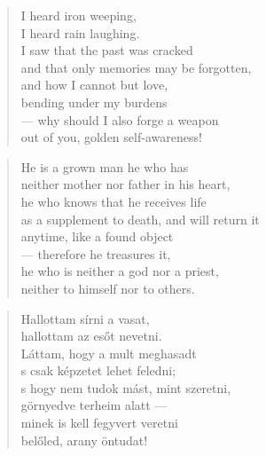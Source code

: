 
\begin{verse}
  I heard iron weeping, \\
  I heard rain laughing. \\
  I saw that the past was cracked \\
  and that only memories may be forgotten, \\
  and how I cannot but love, \\
  bending under my burdens \\
  --- why should I also forge a weapon \\
  out of you, golden self-awareness!
\end{verse}

\bigskip

\label{consciousness_X}

\begin{verse}
  He is a grown man he who has \\
  neither mother nor father in his heart, \\
  he who knows that he receives life \\
  as a supplement to death, and will return it \\
  anytime, like a found object \\
  --- therefore he treasures it, \\
  he who is neither a god nor a priest, \\
  neither to himself nor to others.
\end{verse}

\newpage

\vspace*{-15mm}
\centeredornament



\begin{verse}
  Hallottam sírni a vasat, \\
  hallottam az esőt nevetni. \\
  Láttam, hogy a mult meghasadt \\
  s csak képzetet lehet feledni; \\
  s hogy nem tudok mást, mint szeretni, \\
  görnyedve terheim alatt --- \\
  minek is kell fegyvert veretni \\
  belőled, arany öntudat!
\end{verse}

